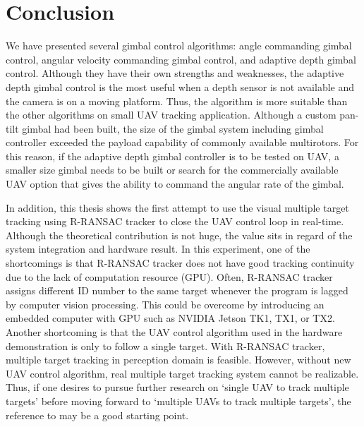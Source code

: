 \chapter{Conclusion}
\label{chapter5}
We have presented several gimbal control algorithms: angle commanding gimbal control, angular velocity commanding gimbal control, and adaptive depth gimbal control. Although they have their own strengths and weaknesses, the adaptive depth gimbal control is the most useful when a depth sensor is not available and the camera is on a moving platform. Thus, the algorithm is more suitable than the other algorithms on small UAV tracking application. Although a custom pan-tilt gimbal had been built, the size of the gimbal system including gimbal controller exceeded the payload capability of commonly available multirotors. For this reason, if the adaptive depth gimbal controller is to be tested on UAV, a smaller size gimbal needs to be built or search for the commercially available UAV option that gives the ability to command the angular rate of the gimbal. 

In addition, this thesis shows the first attempt to use the visual multiple target tracking using R-RANSAC tracker to close the UAV control loop in real-time. Although the theoretical contribution is not huge, the value sits in regard of the system integration and hardware result. In this experiment, one of the shortcomings is that R-RANSAC tracker does not have good tracking continuity due to the lack of computation resource (GPU). Often, R-RANSAC tracker assigns different ID number to the same target whenever the program is lagged by computer vision processing. This could be overcome by introducing an embedded computer with GPU such as NVIDIA Jetson TK1, TX1, or TX2. Another shortcoming is that the UAV control algorithm used in the hardware demonstration is only to follow a single target. With R-RANSAC tracker, multiple target tracking in perception domain is feasible. However, without new UAV control algorithm, real multiple target tracking system cannot be realizable. Thus, if one desires to pursue further research on \lq single UAV to track multiple targets\rq\: before moving forward to \lq multiple UAVs to track multiple targets\rq, the reference to \cite{Gans2011} may be a good starting point.

